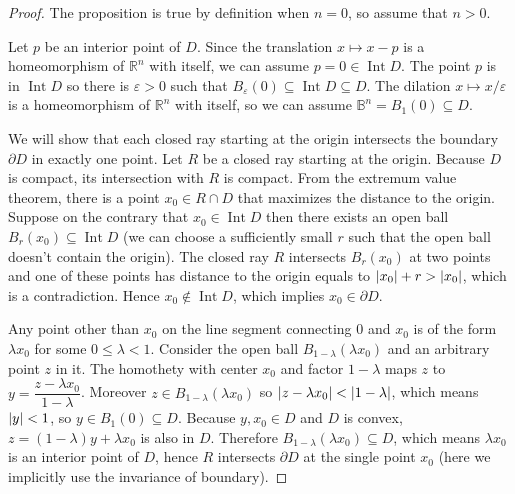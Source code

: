 \begin{proof}
	The proposition is true by definition when \( n = 0 \), so assume that \( n > 0 \).

	Let \( p \) be an interior point of \( D \). Since the translation \( x\mapsto x - p \) is a homeomorphism of \( \mathbb{R}^{n} \) with itself, we can assume \( p = 0 \in \operatorname{Int} D \). The point \( p \) is in \( \operatorname{Int} D \) so there is \( \varepsilon > 0 \) such that \( B_{\varepsilon}(0) \subseteq \operatorname{Int} D \subseteq D \). The dilation \( x\mapsto x/\varepsilon \) is a homeomorphism of \( \mathbb{R}^{n} \) with itself, so we can assume \( \mathbb{B}^{n} = B_{1}(0) \subseteq D \).

	We will show that each closed ray starting at the origin intersects the boundary \( \partial D \) in exactly one point. Let \( R \) be a closed ray starting at the origin. Because \( D \) is compact, its intersection with \( R \) is compact. From the extremum value theorem, there is a point \( x_{0} \in R\cap D \) that maximizes the distance to the origin. Suppose on the contrary that \( x_{0} \in \operatorname{Int} D \) then there exists an open ball \( B_{r}(x_{0}) \subseteq \operatorname{Int} D \) (we can choose a sufficiently small \( r \) such that the open ball doesn't contain the origin). The closed ray \( R \) intersects \( B_{r}(x_{0}) \) at two points and one of these points has distance to the origin equals to \( \left\vert{x_{0}}\right\vert + r > \left\vert{x_{0}}\right\vert \), which is a contradiction. Hence \( x_{0} \notin \operatorname{Int} D \), which implies \( x_{0} \in \partial D \).

	Any point other than \( x_{0} \) on the line segment connecting \( 0 \) and \( x_{0} \) is of the form \( \lambda x_{0} \) for some \( 0\leq \lambda < 1 \). Consider the open ball \( B_{1-\lambda}(\lambda x_{0}) \) and an arbitrary point \( z \) in it. The homothety with center \( x_{0} \) and factor \( 1 - \lambda \) maps \( z \) to \( y = \dfrac{z - \lambda x_{0}}{1 - \lambda} \). Moreover \( z \in B_{1 - \lambda}(\lambda x_{0}) \) so \( \left\vert{z - \lambda x_{0}}\right\vert < \left\vert{1 - \lambda}\right\vert \), which means \( \left\vert{y}\right\vert < 1 \), so \( y \in B_{1}(0) \subseteq D \). Because \( y, x_{0} \in D \) and \( D \) is convex, \( z = (1 - \lambda)y + \lambda x_{0} \) is also in \( D \). Therefore \( B_{1 - \lambda}(\lambda x_{0}) \subseteq D \), which means \( \lambda x_{0} \) is an interior point of \( D \), hence \( R \) intersects \( \partial D \) at the single point \( x_{0} \) (here we implicitly use the invariance of boundary).


\end{proof}
